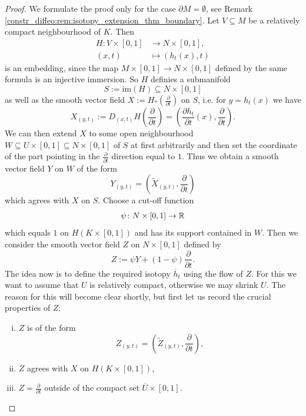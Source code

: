 \begin{proof}
    We formulate the proof only for the case $\partial M = \emptyset$, see Remark \ref{constr_diffeo:rem:isotopy_extension_thm_boundary}. Let $V \subseteq M$ be a relatively compact neighbourhood of $K$. Then
    \begin{align*}
        H \colon V \times [0,1] &\to N \times [0,1], \\
                    (x,t) &\mapsto (h_t(x),t)
    \end{align*}
    is an embedding, since the map $M \times [0,1] \to N \times [0,1]$ defined by the same formula is an injective immersion. So $H$ definies a submanifold
    \[
    S := \mathrm{im}(H) \subseteq N \times [0,1]
    \]
    as well as the smooth vector field $X := H_\ast(\frac{\partial}{\partial t})$ on $S$, i.e. for $y = h_t(x)$ we have 
    \[
    X_{(y,t)} := D_{(x,t)}H\left(\frac{\partial}{\partial t}\right) = \left( \frac{\partial h_t}{\partial t}(x), \frac{\partial}{\partial t} \right).
    \]
    We can then extend $X$ to some open neighbourhood $W \subseteq U \times [0,1] \subseteq N \times [0,1]$ of $S$ at first arbitrarily and then set the coordinate of the part pointing in the $\frac{\partial}{\partial t}$ direction equal to $1$. Thus we obtain a smooth vector field $Y$ on $W$ of the form 
    \[
    Y_{(y,t)} = (\tilde{X}_{(y,t)},\frac{\partial}{\partial t})
    \]
    which agrees with $X$ on $S$. Choose a cut-off function 
    \[
    \psi \colon N \times [0,1] \to \mathbb{R}
    \]
    which equals $1$ on $H(K \times [0,1])$ and has its support contained in $W$. Then we consider the smooth vector field $Z$ on $N \times [0,1]$ defined by
    \[
    Z := \psi Y + (1-\psi)\frac{\partial}{\partial t}.
    \]
    The idea now is to define the required isotopy $\overline{h}_t$ using the flow of $Z$. For this we want to assume that $U$ is relatively compact, otherwise we may shrink $U$. The reason for this will become clear shortly, but first let us record the crucial properties of $Z$:
    \begin{enumerate}[i)]
        \item $Z$ is of the form 
            \[
                Z_{(y,t)} = (\tilde{Z}_{(y,t)},\frac{\partial}{\partial t}),
            \]
        \item $Z$ agrees with $X$ on $H(K \times [0,1])$,
        \item $Z = \frac{\partial}{\partial t}$ outside of the compact set $\overline{U} \times [0,1]$.
    \end{enumerate}
    

\end{proof}
